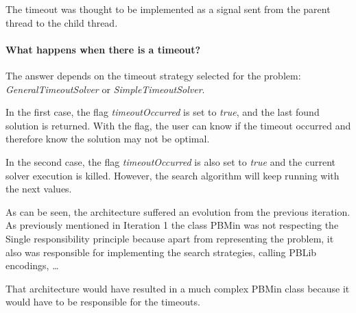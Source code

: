 The timeout was thought to be implemented as a signal sent from the parent thread to the child thread.  



\paragraph{What happens when there is a timeout?\\}

The answer depends on the timeout strategy selected for the problem: \emph{GeneralTimeoutSolver} or \emph{SimpleTimeoutSolver}. 

In the first case, the flag \emph{timeoutOccurred} is set to \emph{true}, and the last found solution is returned. With the flag, the user can know if the timeout occurred and therefore know the solution may not be optimal.  

In the second case, the flag \emph{timeoutOccurred} is also set to \emph{true} and the current solver execution is killed. However, the search algorithm will keep running with the next values.  



As can be seen, the architecture suffered an evolution from the previous iteration. As previously mentioned in Iteration 1 %
the class PBMin was not respecting the Single responsibility principle because apart from representing the problem, it also was responsible for implementing the search strategies, calling PBLib encodings, \ldots 

That architecture would have resulted in a much complex PBMin class because it would have to be responsible for the timeouts.  



